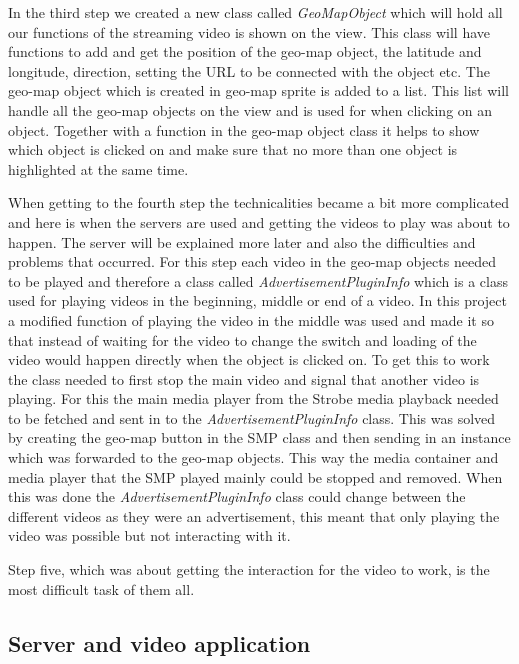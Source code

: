 \documentclass[9pt,a4paper]{acmproc}
\begin{document}
In the third step we created a new class called \textit{GeoMapObject} which will hold all our functions of the streaming video is shown on the view. This class will have functions to add and get the position of the geo-map object, the latitude and longitude, direction, setting the URL to be connected with the object etc. The geo-map object which is created in geo-map sprite is added to a list. This list will handle all the geo-map objects on the view and is used for when clicking on an object. Together with a function in the geo-map object class it helps to show which object is clicked on and make sure that no more than one object is highlighted at the same time.

When getting to the fourth step the technicalities became a bit more complicated and here is when the servers are used and getting the videos to play was about to happen. The server will be explained more later and also the difficulties and problems that occurred. For this step each video in the geo-map objects needed to be played and therefore a class called   \textit{AdvertisementPluginInfo} which is a class used for playing videos in the beginning, middle or end of a video. In this project a modified function of playing the video in the middle was used and made it so that instead of waiting for the video to change the switch and loading of the video would happen directly when the object is clicked on. To get this to work the class needed to first stop the main video and signal that another video is playing. For this the main media player from the Strobe media playback needed to be fetched and sent in to the \textit{AdvertisementPluginInfo} class. This was solved by creating the geo-map button in the SMP class and then sending in an instance which was forwarded to the geo-map objects. This way the media container and media player that the SMP played mainly could be stopped and removed. When this was done the \textit{AdvertisementPluginInfo} class could change between the different videos as they were an advertisement, this meant that only playing the video was possible but not interacting with it.

Step five, which was about getting the interaction for the video to work, is the most difficult task of them all. 



\subsection{Server and video application}
\end{document}
